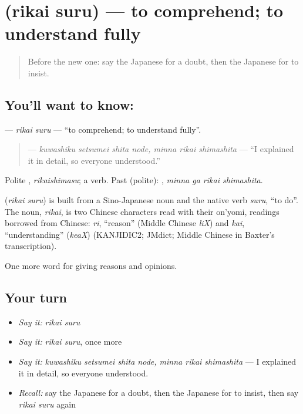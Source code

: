 \section[\texorpdfstring{\ja{りかいする} (rikai suru)}{りかいする (rikai suru)}]{ (rikai suru) — to comprehend; to understand fully}

\label{lesson:JA-C320-rikai-suru}



\begin{quote}
Before the new one: say the Japanese for a doubt, then the Japanese for to insist.
\end{quote}

\subsection*{You'll want to know: }
\textbf{} — \emph{rikai suru} — \textquotedblleft{}to comprehend; to understand fully\textquotedblright{}.

\begin{quote}
\textbf{  } — \emph{kuwashiku setsumei shita node, minna rikai shimashita} — \textquotedblleft{}I explained it in detail, so everyone understood.\textquotedblright{}
\end{quote}

Polite \textbf{}, \emph{rikaishimasu}; a  verb. Past (polite): \textbf{ }, \emph{minna ga rikai shimashita}.

\begin{cousinweb}
\textbf{} (\emph{rikai suru}) is built from a Sino-Japanese noun and the native verb \emph{suru}, \textquotedblleft{}to do\textquotedblright{}. The noun, \emph{rikai}, is two Chinese characters read with their on'yomi, readings borrowed from Chinese: \emph{ri}, \textquotedblleft{}reason\textquotedblright{} (Middle Chinese \emph{liX}) and \emph{kai}, \textquotedblleft{}understanding\textquotedblright{} (\emph{keaX}) (KANJIDIC2; JMdict; Middle Chinese in Baxter's transcription).
\end{cousinweb}

\begin{grammarlens}[title={What you've built}]
One more word for giving reasons and opinions.
\end{grammarlens}

\subsection*{Your turn}
\begin{itemize}
\raggedright
  \item \emph{Say it:} \emph{rikai suru}
  \item \emph{Say it:} \emph{rikai suru}, once more
  \item \emph{Say it:} \emph{kuwashiku setsumei shita node, minna rikai shimashita} — I explained it in detail, so everyone understood.
  \item \emph{Recall:} say the Japanese for a doubt, then the Japanese for to insist, then say \emph{rikai suru} again
\end{itemize}

